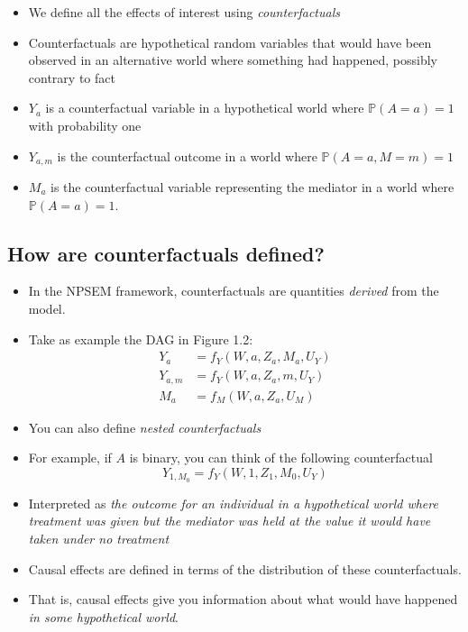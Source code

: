 \documentclass[
  12pt,
]{book}
\providecommand{\tightlist}{%
  \setlength{\itemsep}{0pt}\setlength{\parskip}{0pt}}
\theoremstyle{definition}
\theoremstyle{definition}
\theoremstyle{definition}
\renewcommand{\P}{\mathbb{P}}
\newcommand{\1}{\mathbbm{1}}
\begin{document}
\begin{itemize}
\tightlist
\item
  We define all the effects of interest using \emph{counterfactuals}
\item
  Counterfactuals are hypothetical random variables that would have been
  observed in an alternative world where something had happened, possibly
  contrary to fact 
\item
  \(Y_a\) is a counterfactual variable in a hypothetical world where \(\P(A=a)=1\)
  with probability one
\item
  \(Y_{a,m}\) is the counterfactual outcome in a world where \(\P(A=a,M=m)=1\)
\item
  \(M_a\) is the counterfactual variable representing the mediator in a world
  where \(\P(A=a)=1\).
\end{itemize}

\hypertarget{how-are-counterfactuals-defined}{%
\subsection{How are counterfactuals defined?}\label{how-are-counterfactuals-defined}}

\begin{itemize}
\tightlist
\item
  In the NPSEM framework, counterfactuals are quantities \emph{derived} from the
  model.
\item
  Take as example the DAG in Figure 1.2:
  \begin{align}
    Y_a  &= f_Y(W, a, Z_a, M_a, U_Y)\\
    Y_{a,m}  &= f_Y(W, a, Z_a, m, U_Y)\\
    M_a  &= f_M(W, a, Z_a, U_M)
  \end{align}
\item
  You can also define \emph{nested counterfactuals}
\item
  For example, if \(A\) is binary, you can think of the following counterfactual
  \begin{equation*}
    Y_{1, M_0} = f_Y(W, 1, Z_1, M_0, U_Y)
  \end{equation*}
\item
  Interpreted as \emph{the outcome for an individual in a hypothetical world where
  treatment was given but the mediator was held at the value it would have
  taken under no treatment}
\item
  Causal effects are defined in terms of the distribution of these
  counterfactuals.
\item
  That is, causal effects give you information about what would have happened
  \emph{in some hypothetical world}.
\end{itemize}
\end{document}
